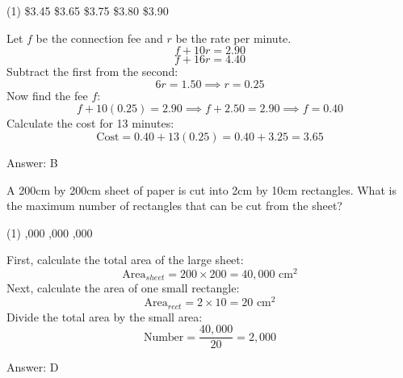 \documentclass[11pt,paper=a4,answers]{exam}
\begin{document}
\begin{questions}
\begin{tasks}(1)
\task[A)] \$3.45 \task[B)] \$3.65 \task[C)] \$3.75 \task[D)] \$3.80 \task[E)] \$3.90
\end{tasks}

\begin{solution}
Let $f$ be the connection fee and $r$ be the rate per minute.
\vspace{5pt}
\[ f + 10r = 2.90 \]
\vspace{5pt}
\[ f + 16r = 4.40 \]
\vspace{5pt}
Subtract the first from the second:
\vspace{5pt}
\[ 6r = 1.50 \implies r = 0.25 \]
\vspace{5pt}
Now find the fee $f$:
\vspace{5pt}
\[ f + 10(0.25) = 2.90 \implies f + 2.50 = 2.90 \implies f = 0.40 \]
\vspace{5pt}
Calculate the cost for 13 minutes:
\vspace{5pt}
\[ \text{Cost} = 0.40 + 13(0.25) = 0.40 + 3.25 = 3.65 \]

Answer: \colorbox{yellow!100}{B}
\end{solution}

\vspace{1cm}

\question
A 200cm by 200cm sheet of paper is cut into 2cm by 10cm rectangles. What is the maximum number of rectangles that can be cut from the sheet?

\begin{tasks}(1)
  ,000 ,000 ,000
\end{tasks}

\begin{solution}
First, calculate the total area of the large sheet:
\vspace{5pt}
\[ \text{Area}_{sheet} = 200 \times 200 = 40,000 \text{ cm}^2 \]
\vspace{5pt}
Next, calculate the area of one small rectangle:
\vspace{5pt}
\[ \text{Area}_{rect} = 2 \times 10 = 20 \text{ cm}^2 \]
\vspace{5pt}
Divide the total area by the small area:
\vspace{5pt}
\[ \text{Number} = \dfrac{40,000}{20} = 2,000 \]

Answer: \colorbox{yellow!100}{D}
\end{solution}

\vspace{1cm}


\end{questions}
\end{document}
